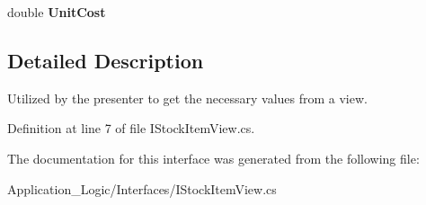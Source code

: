 \begin{DoxyCompactItemize}
\item 
\hypertarget{interface_application_logic_1_1_interfaces_1_1_i_stock_item_view_acd7584a74fbd09f78461078a665de311}{
double {\bfseries UnitCost}}
\label{interface_application_logic_1_1_interfaces_1_1_i_stock_item_view_acd7584a74fbd09f78461078a665de311}

\end{DoxyCompactItemize}


\subsection{Detailed Description}
Utilized by the presenter to get the necessary values from a view. 

Definition at line 7 of file IStockItemView.cs.



The documentation for this interface was generated from the following file:\begin{DoxyCompactItemize}
\item 
Application\_\-Logic/Interfaces/IStockItemView.cs\end{DoxyCompactItemize}
